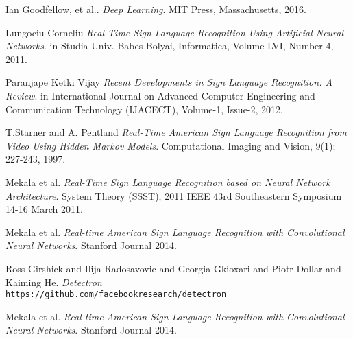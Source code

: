 \label{CapFT}

\begin{thebibliography}{9}
Ian Goodfellow, et al.. 
\textit{Deep Learning}. 
MIT Press, Massachusetts, 2016.
 
Lungociu Corneliu
\textit{Real Time Sign Language Recognition Using Artificial Neural Networks}.
in Studia Univ. Babes-Bolyai, Informatica, Volume LVI, Number 4, 2011. 

Paranjape Ketki Vijay
\textit{Recent Developments in Sign Language Recognition: A Review}.
in International Journal on Advanced Computer Engineering and Communication Technology (IJACECT), Volume-1, Issue-2, 2012. 

T.Starner and A. Pentland
\textit{Real-Time American Sign Language Recognition from Video Using Hidden Markov Models}.
Computational Imaging and Vision, 9(1); 227-243, 1997.

Mekala et al.
\textit{Real-Time Sign Language Recognition based on Neural Network Architecture}.
System Theory (SSST), 2011 IEEE 43rd Southeastern Symposium 14-16 March 2011. 

Mekala et al.
\textit{Real-time American Sign Language Recognition with Convolutional Neural
Networks}.
Stanford Journal 2014. 

Ross Girshick and Ilija Radosavovic and Georgia Gkioxari and Piotr Dollar and Kaiming He.
\textit{Detectron}
\\\texttt{https://github.com/facebookresearch/detectron}

Mekala et al.
\textit{Real-time American Sign Language Recognition with Convolutional Neural
Networks}.
Stanford Journal 2014. 


\end{thebibliography}

